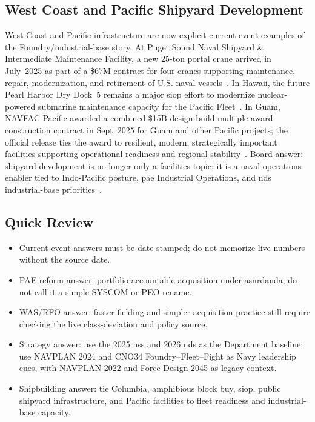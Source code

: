 \documentclass[../main.tex]{subfiles}
\begin{document}
\subsection{West Coast and Pacific Shipyard Development}
West Coast and Pacific infrastructure are now explicit current-event examples of the Foundry/industrial-base story. At Puget Sound Naval Shipyard \& Intermediate Maintenance Facility, a new 25-ton portal crane arrived in July~2025 as part of a \$67M contract for four cranes supporting maintenance, repair, modernization, and retirement of U.S. naval vessels~\autocite{NAVSEA-PSNS-Cranes-2025}. In Hawaii, the future Pearl Harbor Dry Dock~5 remains a major \ac{siop} effort to modernize nuclear-powered submarine maintenance capacity for the Pacific Fleet~\autocite{NAVFAC-PHNSY-DryDock5-CNO-2025,NAVFAC-PHNSY-DryDock5-2023}. In Guam, NAVFAC Pacific awarded a combined \$15B design-build multiple-award construction contract in Sept~2025 for Guam and other Pacific projects; the official release ties the award to resilient, modern, strategically important facilities supporting operational readiness and regional stability~\autocite{NAVFAC-Pacific-Guam-DBMACC-2025}. Board answer: shipyard development is no longer only a facilities topic; it is a naval-operations enabler tied to Indo-Pacific posture, \ac{pae} Industrial Operations, and \ac{nds} industrial-base priorities~\autocite{NDS-2026,DON-PAE-Establishment-2026}.

\subsection{Quick Review}
\begin{itemize}
  \item Current-event answers must be date-stamped; do not memorize live numbers without the source date.
  \item PAE reform answer: portfolio-accountable acquisition under \ac{asnrdanda}; do not call it a simple SYSCOM or PEO rename.
  \item WAS/RFO answer: faster fielding and simpler acquisition practice still require checking the live class-deviation and policy source.
  \item Strategy answer: use the 2025 \ac{nss} and 2026 \ac{nds} as the Department baseline; use NAVPLAN 2024 and CNO34 Foundry--Fleet--Fight as Navy leadership cues, with NAVPLAN 2022 and Force Design 2045 as legacy context.
  \item Shipbuilding answer: tie Columbia, amphibious block buy, \ac{siop}, public shipyard infrastructure, and Pacific facilities to fleet readiness and industrial-base capacity.
\end{itemize}

\end{document}
